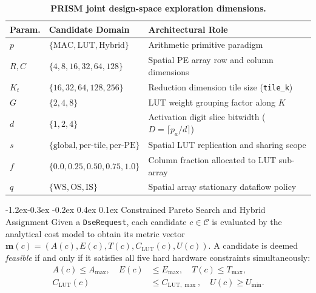 \documentclass[10pt,letterpaper,twocolumn]{article}
\makeatletter
\renewcommand\subsection{\@startsection{subsection}{2}{\z@}%
  {-1.2ex\@plus -0.3ex \@minus -0.2ex}%
  {0.4ex \@plus 0.1ex}%
  {\normalfont\normalsize\bfseries}}
\makeatother
\begin{document}
\begin{table}[t]
  \centering
  \caption{\textbf{PRISM joint design-space exploration dimensions.}}
  \label{tab:search_space}
  \footnotesize
  \setlength{\tabcolsep}{3.0pt}
  \begin{tabularx}{\columnwidth}{llX}
    \toprule
    \textbf{Param.} & \textbf{Candidate Domain} & \textbf{Architectural Role} \\
    \midrule
    $p$ & $\{\text{MAC}, \text{LUT}, \text{Hybrid}\}$ & Arithmetic primitive paradigm \\
    $R, C$ & $\{4, 8, 16, 32, 64, 128\}$ & Spatial PE array row and column dimensions \\
    $K_t$ & $\{16, 32, 64, 128, 256\}$ & Reduction dimension tile size (\texttt{tile\_k}) \\
    $G$ & $\{2, 4, 8\}$ & LUT weight grouping factor along $K$ \\
    $d$ & $\{1, 2, 4\}$ & Activation digit slice bitwidth ($D = \lceil p_a/d \rceil$) \\
    $s$ & $\{\text{global}, \text{per-tile}, \text{per-PE}\}$ & Spatial LUT replication and sharing scope \\
    $f$ & $\{0.0, 0.25, 0.50, 0.75, 1.0\}$ & Column fraction allocated to LUT sub-array \\
    $q$ & $\{\text{WS}, \text{OS}, \text{IS}\}$ & Spatial array stationary dataflow policy \\
    \bottomrule
  \end{tabularx}
\end{table}

\subsection{Constrained Pareto Search and Hybrid Assignment}
Given a \texttt{DseRequest}, each candidate $c \in \mathcal{C}$ is evaluated by the analytical cost model to obtain its metric vector $\mathbf{m}(c) = \left(A(c), E(c), T(c), C_{\text{LUT}}(c), U(c)\right)$. A candidate is deemed \emph{feasible} if and only if it satisfies all five hard hardware constraints simultaneously:
\begin{align}
  A(c) \le A_{\max}, \quad E(c) &\le E_{\max}, \quad T(c) \le T_{\max}, \nonumber \\
  C_{\text{LUT}}(c) &\le C_{\text{LUT},\max}, \quad U(c) \ge U_{\min}.
  \label{eq:constraints}
\end{align}
\end{document}
